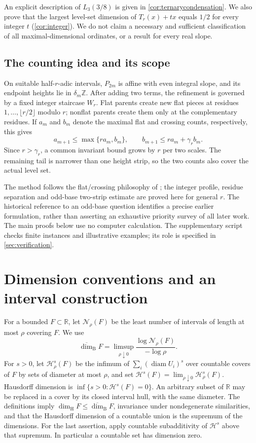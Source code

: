 \documentclass[11pt]{article}
\theoremstyle{definition}
\theoremstyle{remark}
\newcommand{\R}{\mathbb R}
\newcommand{\Z}{\mathbb Z}
\newcommand{\dimH}{\dim_{\mathrm H}}
\newcommand{\dimB}{\overline{\dim}_{\mathrm B}}
\newcommand{\HH}{\mathcal H}
\newcommand{\diam}{\operatorname{diam}}
\begin{document}
An explicit description of $L_3(3/8)$ is given in
\cref{cor:ternarycondensation}. We also prove that the largest level-set
dimension of $T_r(x)+tx$ equals $1/2$ for every integer $t$
(\cref{cor:integer}). We do not claim a necessary and sufficient
classification of all maximal-dimensional ordinates, or a result for every
real slope.

\subsection{The counting idea and its scope}
On suitable half-$r$-adic intervals, $P_{2m}$ is affine with even integral
slope, and its endpoint heights lie in $\delta_m\Z$. After adding two
terms, the refinement is governed by a fixed integer staircase $W_r$.
Flat parents create new flat pieces at residues
$1,\ldots,\lfloor r/2\rfloor$ modulo $r$; nonflat parents create them only
at the complementary residues. If $a_m$ and $b_m$ denote the maximal flat
and crossing counts, respectively, this gives
\[
 a_{m+1}\le\max\{ra_m,b_m\},\qquad
 b_{m+1}\le ra_m+\gamma_rb_m.
\]
Since $r>\gamma_r$, a common invariant bound grows by $r$ per two scales.
The remaining tail is narrower than one height strip, so the two counts
also cover the actual level set.

The method follows the flat/crossing philosophy of
\cite[Section~3.1]{allaartdimension}; the integer profile, residue
separation and odd-base two-strip estimate are proved here for general
$r$. The historical reference to an odd-base question identifies a precise
earlier formulation, rather than asserting an exhaustive priority survey
of all later work. The main proofs below use no computer calculation.
The supplementary script checks finite instances and illustrative examples;
its role is specified in \cref{sec:verification}.

\section{Dimension conventions and an interval construction}
For a bounded $F\subset\R$, let $\mathcal N_\rho(F)$ be the least number
of intervals of length at most $\rho$ covering $F$. We use
\[
 \dimB F=\limsup_{\rho\downarrow0}
 \frac{\log\mathcal N_\rho(F)}{-\log\rho}.
\]
For $s>0$, let $\HH^s_\rho(F)$ be the infimum of
$\sum_i(\diam U_i)^s$ over countable covers of $F$ by sets of diameter at
most $\rho$, and set $\HH^s(F)=\lim_{\rho\downarrow0}\HH^s_\rho(F)$.
Hausdorff dimension is $\inf\{s>0:\HH^s(F)=0\}$.
An arbitrary subset of $\R$ may be replaced in a cover by its closed
interval hull, with the same diameter.
The definitions imply $\dimH F\le\dimB F$, invariance under nondegenerate
similarities, and that the Hausdorff dimension of a countable union is
the supremum of the dimensions. For the last assertion, apply countable
subadditivity of $\HH^s$ above that supremum. In particular a countable
set has dimension zero.
\end{document}
